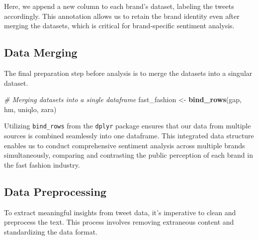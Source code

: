\documentclass[
]{book}
\newenvironment{Shaded}{\begin{snugshade}}{\end{snugshade}}
\newcommand{\CommentTok}[1]{\textcolor[rgb]{0.56,0.35,0.01}{\textit{#1}}}
\newcommand{\FunctionTok}[1]{\textcolor[rgb]{0.13,0.29,0.53}{\textbf{#1}}}
\newcommand{\NormalTok}[1]{#1}
\newcommand{\OtherTok}[1]{\textcolor[rgb]{0.56,0.35,0.01}{#1}}
\begin{document}
Here, we append a new column to each brand's dataset, labeling the tweets accordingly. This annotation allows us to retain the brand identity even after merging the datasets, which is critical for brand-specific sentiment analysis.

\hypertarget{data-merging}{%
\subsection*{Data Merging}\label{data-merging}}

The final preparation step before analysis is to merge the datasets into a singular dataset.

\begin{Shaded}
\begin{Highlighting}[]
\CommentTok{\# Merging datasets into a single dataframe}
\NormalTok{fast\_fashion }\OtherTok{\textless{}{-}} \FunctionTok{bind\_rows}\NormalTok{(gap, hm, uniqlo, zara)}
\end{Highlighting}
\end{Shaded}

Utilizing \texttt{bind\_rows} from the \texttt{dplyr} package ensures that our data from multiple sources is combined seamlessly into one dataframe. This integrated data structure enables us to conduct comprehensive sentiment analysis across multiple brands simultaneously, comparing and contrasting the public perception of each brand in the fast fashion industry.

\hypertarget{data-preprocessing}{%
\subsection*{Data Preprocessing}\label{data-preprocessing}}

To extract meaningful insights from tweet data, it's imperative to clean and preprocess the text. This process involves removing extraneous content and standardizing the data format.
\end{document}
